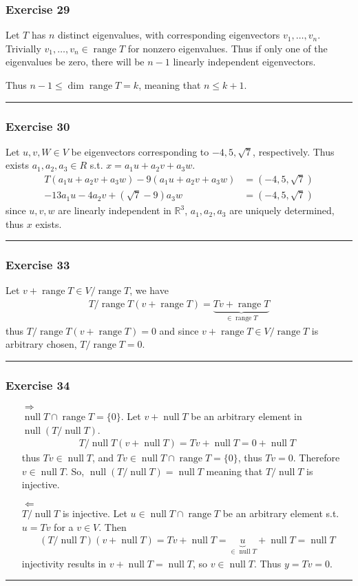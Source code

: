 \documentclass[12pt, letterpaper]{scrartcl}
\newcommand{\R}{\mathbb{R}}
\DeclareMathOperator{\Null}{null}
\DeclareMathOperator{\Range}{range}
\begin{document}
\subsubsection*{Exercise 29}
Let $T$ has $n$ distinct eigenvalues, with corresponding eigenvectors $v_1,\dots,v_n$. Trivially  $v_1,\dots,v_n\in\Range T$ for nonzero eigenvalues. Thus if only one of the eigenvalues be zero, there will be $n-1$ linearly independent eigenvectors.

Thus $n-1\leq \dim\Range T=k$, meaning that $n\leq k+1$.
\vskip1mm\hrule

\subsubsection*{Exercise 30}
Let $u,v,W\in V$ be eigenvectors corresponding to $-4, 5, \sqrt{7}$, respectively.
Thus exists $a_1, a_2, a_3\in R$ s.t. $x=a_1u+a_2v+a_3w$.
\begin{align*}
    T(a_1u+a_2v+a_3w)-9(a_1u+a_2v+a_3w)&=(-4,5,\sqrt{7})\\
    -13a_1u-4a_2v+(\sqrt{7}-9)a_3w&=(-4,5,\sqrt{7})
\end{align*}
since $u,v,w$ are linearly independent in $\R^3$, $a_1, a_2, a_3$ are uniquely determined, thus $x$ exists.
\vskip1mm\hrule

\subsubsection*{Exercise 33}
Let $v+\Range T\in V/\Range T$, we have
\begin{align*}
    T/\Range T(v+\Range T)=\underbrace{Tv + \Range T}_{\in\Range T}
\end{align*}
thus $T/\Range T(v+\Range T)=0$ and since $v+\Range T\in V/\Range T$ is arbitrary chosen, $T/\Range T=0$.
\vskip1mm\hrule

\subsubsection*{Exercise 34}
\begin{itemize}
    \item[$\Longrightarrow$]\mbox{}\\
    $\Null T \cap \Range T = \{0\}$. Let $v+\Null T$ be an arbitrary element in $\Null(T/\Null T)$.
    \begin{align*}
        T/\Null T(v+\Null T) = Tv + \Null T=0+\Null T
    \end{align*}
    thus $Tv\in\Null T$, and $Tv\in\Null T \cap \Range T= \{0\}$, thus $Tv=0$. Therefore $v\in\Null T$. So, $\Null(T/\Null T)=\Null T$ meaning that $T/\Null T$ is injective.
    \item[$\Longleftarrow$]\mbox{}\\
    $T/\Null T$ is injective. Let $u\in\Null T \cap \Range T$ be an arbitrary element s.t. $u=Tv$ for a $v\in V$. Then
    \begin{align*}
        (T/\Null T)(v+\Null T)=Tv + \Null T=\underbrace{u}_{\in\Null T}+ \Null T=\Null T
    \end{align*}
    injectivity results in $v+\Null T=\Null T$, so $v\in\Null T$. Thus $y=Tv=0$.
\end{itemize}
\vskip1mm\hrule
\end{document}
